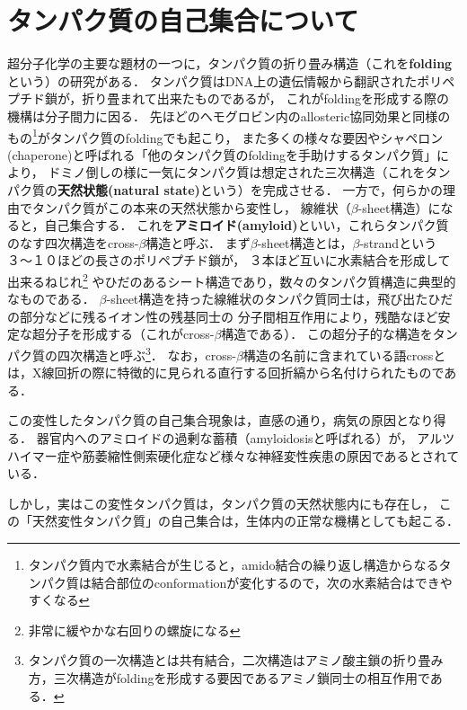 \documentclass[uplatex,dvipdfmx]{jsarticle}
\begin{document}

\section{タンパク質の自己集合について}

超分子化学の主要な題材の一つに，タンパク質の折り畳み構造（これを\textbf{folding}という）の研究がある．
タンパク質はDNA上の遺伝情報から翻訳されたポリペプチド鎖が，折り畳まれて出来たものであるが，
これがfoldingを形成する際の機構は分子間力に因る．
先ほどのヘモグロビン内のallosteric協同効果と同様のもの\footnote{タンパク質内で水素結合が生じると，amido結合の繰り返し構造からなるタンパク質は結合部位のconformationが変化するので，次の水素結合はできやすくなる}がタンパク質のfoldingでも起こり，
また多くの様々な要因やシャペロン(chaperone)と呼ばれる「他のタンパク質のfoldingを手助けするタンパク質」により，
ドミノ倒しの様に一気にタンパク質は想定された三次構造（これをタンパク質の\textbf{天然状態(natural state)}という）を完成させる．
一方で，何らかの理由でタンパク質がこの本来の天然状態から変性し，
線維状（$\beta$-sheet構造）になると，自己集合する．
これを\textbf{アミロイド(amyloid)}といい，これらタンパク質のなす四次構造をcross-$\beta$構造と呼ぶ．
まず$\beta$-sheet構造とは，$\beta$-strandという３〜１０ほどの長さのポリペプチド鎖が，
３本ほど互いに水素結合を形成して出来るねじれ\footnote{非常に緩やかな右回りの螺旋になる}
やひだのあるシート構造であり，数々のタンパク質構造に典型的なものである．
$\beta$-sheet構造を持った線維状のタンパク質同士は，飛び出たひだの部分などに残るイオン性の残基同士の
分子間相互作用により，残酷なほど安定な超分子を形成する（これがcross-$\beta$構造である）．
この超分子的な構造をタンパク質の四次構造と呼ぶ\footnote{タンパク質の一次構造とは共有結合，二次構造はアミノ酸主鎖の折り畳み方，三次構造がfoldingを形成する要因であるアミノ鎖同士の相互作用である．}．
なお，cross-$\beta$構造の名前に含まれている語crossとは，X線回折の際に特徴的に見られる直行する回折縞から名付けられたものである．

この変性したタンパク質の自己集合現象は，直感の通り，病気の原因となり得る．
器官内へのアミロイドの過剰な蓄積（amyloidosisと呼ばれる）が，
アルツハイマー症や筋萎縮性側索硬化症など様々な神経変性疾患の原因であるとされている．

しかし，実はこの変性タンパク質は，タンパク質の天然状態内にも存在し，
この「天然変性タンパク質」の自己集合は，生体内の正常な機構としても起こる．
\end{document}
